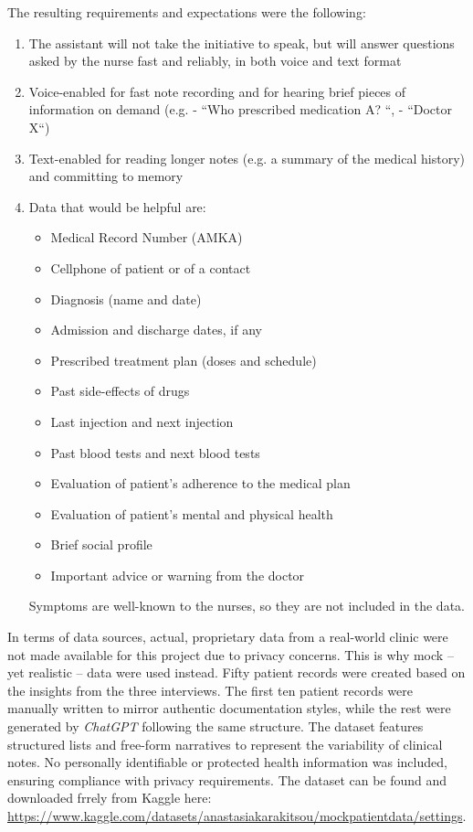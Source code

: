 The resulting requirements and expectations were the following:
\begin{enumerate}
\item The assistant will not take the initiative to speak, but will answer questions asked by the nurse fast and reliably, in both voice and text format
\item Voice-enabled for fast note recording and for hearing brief pieces of information on demand (e.g. - ``Who prescribed medication A? ``, -  ``Doctor X``)
\item Text-enabled for reading longer notes (e.g. a summary of the medical history) and committing to memory
\item Data that would be helpful are:
\begin{itemize}
    \item Medical Record Number (AMKA)
    \item Cellphone of patient or of a contact
    \item Diagnosis (name and date)
    \item Admission and discharge dates, if any
    \item Prescribed treatment plan (doses and schedule)
    \item Past side-effects of drugs
    \item Last injection and next injection
    \item Past blood tests and next blood tests
    \item Evaluation of patient's adherence to the medical plan
    \item Evaluation of patient's mental and physical health
    \item Brief social profile
    \item Important advice or warning from the doctor
\end{itemize}       
Symptoms are well-known to the nurses, so they are not included in the data.
\end{enumerate}

In terms of data sources, actual, proprietary data from a real-world clinic were not made available for this project due to privacy concerns. This is why mock -- yet realistic -- data were used instead. Fifty patient records were created based on the insights from the three interviews. The first ten patient records were manually written to mirror authentic documentation styles, while the rest were generated by \textit{ChatGPT} following the same structure. The dataset features structured lists and free-form narratives to represent the variability of clinical notes. No personally identifiable or protected health information was included, ensuring compliance with privacy requirements. The dataset can be found and downloaded frrely from Kaggle here: \url{https://www.kaggle.com/datasets/anastasiakarakitsou/mockpatientdata/settings}.

